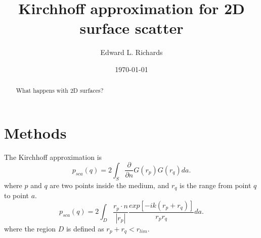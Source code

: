 \documentclass[preprint,NumberedRefs]{JASA}
\begin{document}
\title[Kirchhoff surface scatter]{Kirchhoff approximation for 2D surface scatter}
\author{Edward L. Richards}


\date{\today}

\begin{abstract}
    What happens with 2D surfaces?
\end{abstract}

\maketitle

\section{\label{sec:methods} Methods}
The Kirchhoff approximation is
\begin{equation}
    p_{sca}(q) = 2 \int_S \frac{\partial}{\partial n} G(r_p) G(r_q) d a.
\end{equation}
where $p$ and $q$ are two points inside the medium, and $r_q$ is the range from point $q$ to point $a$.
\begin{equation}
    p_{sca}(q) = 2 \int_D \frac{r_p \cdot n}{|r_p|} \frac{exp\left[-i k (r_p + r_q)\right]} {r_p r_q} d a.
\end{equation}
where the region $D$ is defined as $r_p + r_q < r_{lim}$.
\end{document}
